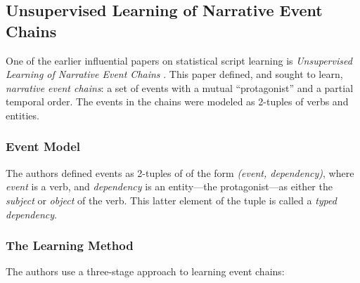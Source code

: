 \subsection{Unsupervised Learning of Narrative Event Chains}
\label{sec:chambers}

One of the earlier influential papers on statistical script learning is \textit{Unsupervised Learning of Narrative Event Chains} \citep{chambers2008unsupervised}. This paper defined, and sought to learn, \textit{narrative event chains}: a set of events with a mutual ``protagonist'' and a partial temporal order. The events in the chains were modeled as 2-tuples of verbs and entities.

\subsubsection{Event Model}
The authors defined events as 2-tuples of of the form \textit{(event, dependency)}, where \textit{event} is a verb, and \textit{dependency} is an entity---the protagonist---as either the \textit{subject} or \textit{object} of the verb. This latter element of the tuple is called a \textit{typed dependency}.

\subsubsection{The Learning Method}
The authors use a three-stage approach to learning event chains:

